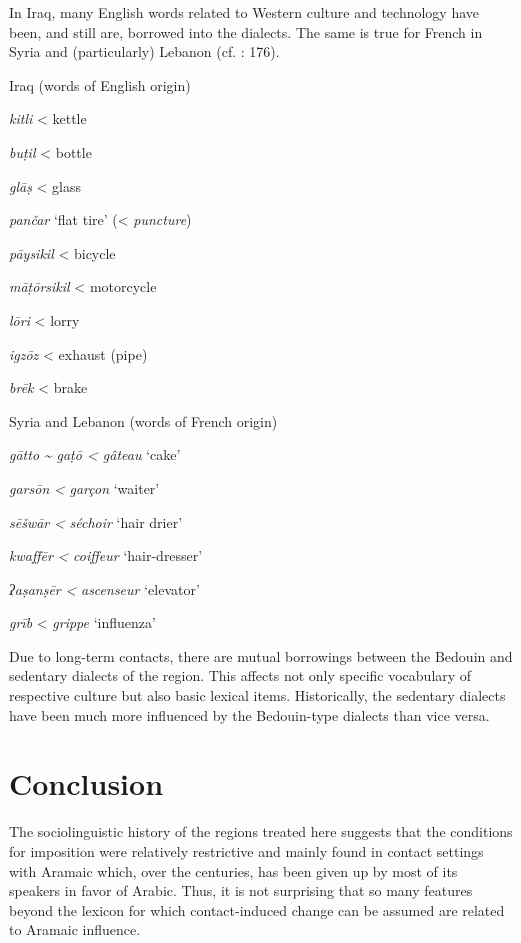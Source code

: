 \documentclass[output=paper]{langsci/langscibook}
\begin{document}
In Iraq, many English words related to Western culture and technology have been, and still are, borrowed into the dialects. The same is true for French in Syria and (particularly) Lebanon (cf. \citealt{Barbot1961}: 176).

\ea
Iraq (words of English origin)

\textit{kitli} < kettle 

\textit{buṭil} < bottle

\textit{glāṣ} < glass

\textit{pančar} ‘flat tire’ (< \textit{puncture})

\textit{pāysikil} < bicycle

\textit{māṭōrsikil} < motorcycle

\textit{lōri} < lorry 

\textit{igzōz} < exhaust (pipe)

\textit{brēk} < brake
\z

\ea
Syria and Lebanon (words of French origin)

\textit{gātto} \textit{{\textasciitilde} gaṭō < gâteau} ‘cake’

\textit{garsōn} \textit{<} \textit{garçon} ‘waiter’

\textit{sēšwār} \textit{<} \textit{séchoir} ‘hair drier’

\textit{kwaffēr} \textit{<} \textit{coiffeur} ‘hair-dresser’

\textit{ʔaṣanṣēr} \textit{<} \textit{ascenseur} ‘elevator’

\textit{grīb} < \textit{grippe} ‘influenza’
\z

Due to long-term contacts, there are mutual borrowings between the Bedouin and sedentary dialects of the region. This affects not only specific vocabulary of respective culture but also basic lexical items. Historically, the sedentary dialects have been much more influenced by the Bedouin-type dialects than vice versa. 

\section{Conclusion} 

The sociolinguistic history of the regions treated here suggests that the conditions for imposition were relatively restrictive and mainly found in contact settings with Aramaic which, over the centuries, has been given up by most of its speakers in favor of Arabic. Thus, it is not surprising that so many features beyond the lexicon for which contact-induced change can be assumed are related to Aramaic influence. 
\end{document}
